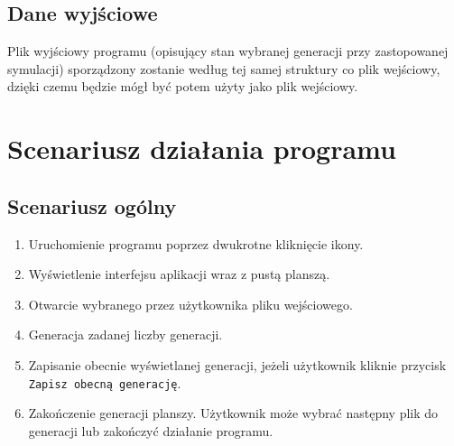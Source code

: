 \documentclass[a4paper,11pt, notitlepage ]{article}
\begin{document}
\subsection{Dane wyjściowe}
Plik wyjściowy programu (opisujący stan wybranej generacji przy zastopowanej symulacji) sporządzony zostanie według tej samej struktury co plik wejściowy, dzięki czemu będzie mógł być potem użyty jako plik wejściowy. 

\section{Scenariusz działania programu}
\subsection{Scenariusz ogólny}
\begin{enumerate}
\item Uruchomienie programu poprzez dwukrotne kliknięcie ikony.
\item Wyświetlenie interfejsu aplikacji wraz z pustą planszą.
\item Otwarcie wybranego przez użytkownika pliku wejściowego.
\item Generacja zadanej liczby generacji.
\item Zapisanie obecnie wyświetlanej generacji, jeżeli użytkownik kliknie przycisk \verb+Zapisz obecną generację+.
\item Zakończenie generacji planszy. Użytkownik może wybrać następny plik do generacji lub zakończyć działanie programu.
\end{enumerate}
\end{document}
